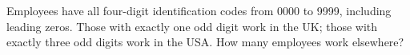Employees have all four-digit identification codes from 0000 to 9999, including leading zeros. Those with exactly one odd digit work in the UK; those with exactly three odd digits work in the USA. How many employees work elsewhere?
